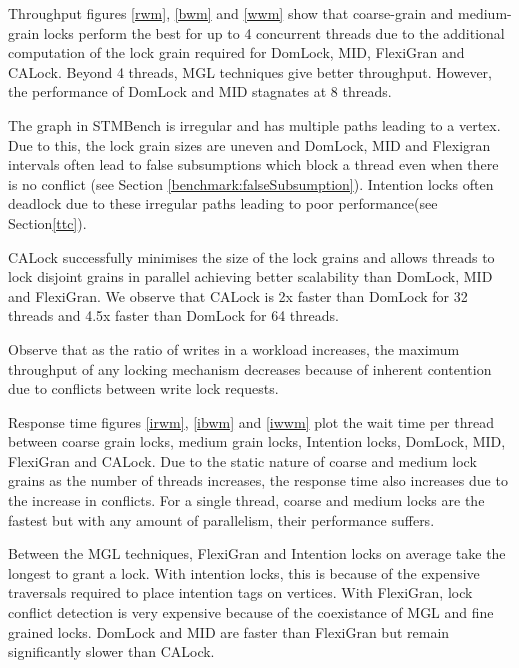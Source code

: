 Throughput figures \ref{rwm}, \ref{bwm} and \ref{wwm} show that coarse-grain and medium-grain locks perform the best for up to 4 concurrent threads due to the additional computation of the lock grain required for DomLock, MID, FlexiGran and CALock. Beyond 4 threads, MGL techniques give better throughput. However, the performance of DomLock and MID stagnates at 8 threads.

The graph in STMBench is irregular and has multiple paths leading to a vertex. Due to this, the lock grain sizes are uneven and DomLock, MID and Flexigran intervals often lead to false subsumptions which block a thread even when there is no conflict (see Section \ref{benchmark:falseSubsumption}). Intention locks often deadlock due to these irregular paths leading to poor performance(see Section\ref{ttc}). 

CALock successfully minimises the size of the lock grains and allows threads to lock disjoint grains in parallel achieving better scalability than DomLock, MID and FlexiGran.
We observe that CALock is 2x faster than DomLock for 32 threads and 4.5x faster than DomLock for 64 threads.

Observe that as the ratio of writes in a workload increases, the maximum throughput of any locking mechanism decreases because of inherent contention due to conflicts between write lock requests.



Response time figures \ref{irwm}, \ref{ibwm} and \ref{iwwm} plot the wait time per thread between coarse grain locks, medium grain locks, Intention locks,  DomLock, MID, FlexiGran and CALock.
Due to the static nature of coarse and medium lock grains as the number of threads increases, the response time also increases due to the increase in conflicts. For a single thread, coarse and medium locks are the fastest but with any amount of parallelism, their performance suffers. 

Between the MGL techniques, FlexiGran and Intention locks on average take the longest to grant a lock. With intention locks, this is because of the expensive traversals required to place intention tags on vertices. With FlexiGran, lock conflict detection is very expensive because of the coexistance of MGL and fine grained locks. DomLock and MID are faster than FlexiGran but remain significantly slower than CALock. 

